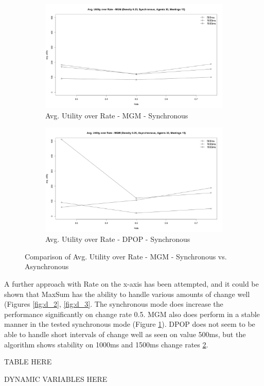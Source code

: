 \begin{figure}[H]
\centering
\begin{subfigure}{0.5\textwidth}
  \centering
  \includegraphics[width=1\linewidth]{graphics/experiments/dynamic/d_4.png}
  \caption{Avg. Utility over Rate - MGM - Synchronous}
  \label{fig:d_4}
\end{subfigure}%
\begin{subfigure}{0.5\textwidth}
  \centering
  \includegraphics[width=1\linewidth]{graphics/experiments/dynamic/d_5.png}
  \caption{Avg. Utility over Rate - DPOP - Synchronous}
  \label{fig:d_5}
\end{subfigure}
\caption{Comparison of Avg. Utility over Rate - MGM - Synchronous vs. Asynchronous}
\label{fig:test}
\end{figure}

A further approach with Rate on the x-axis has been attempted, and it could be shown that MaxSum has the ability to handle various amounts of change well (Figures \ref{fig:d_2}, \ref{fig:d_3}. The synchronous mode does increase the performance significantly on change rate 0.5. MGM also does perform in a stable manner in the tested synchronous mode (Figure \ref{fig:d_4}). DPOP does not seem to be able to handle short intervals of change well as seen on value 500ms, but the algorithm shows stability on 1000ms and 1500ms change rates \ref{fig:d_5}.

TABLE HERE

DYNAMIC VARIABLES HERE






